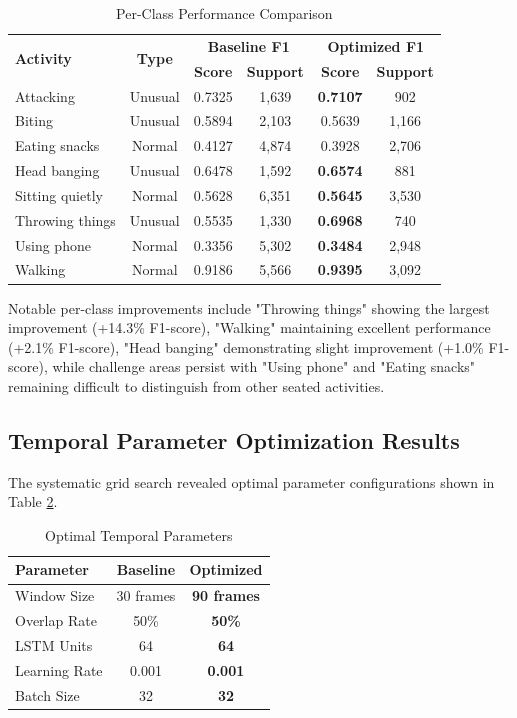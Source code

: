 \documentclass{iopconfser}
\begin{document}
\begin{table}[H]
\centering
\caption{Per-Class Performance Comparison}
\label{tab:class_performance}
\small
\begin{tabular}{lccccc}
\toprule
\multirow{2}{*}{\textbf{Activity}} & \multirow{2}{*}{\textbf{Type}} & \multicolumn{2}{c}{\textbf{Baseline F1}} & \multicolumn{2}{c}{\textbf{Optimized F1}} \\
\cmidrule(lr){3-4} \cmidrule(lr){5-6}
& & \textbf{Score} & \textbf{Support} & \textbf{Score} & \textbf{Support} \\
\midrule
Attacking & Unusual & 0.7325 & 1,639 & \textbf{0.7107} & 902 \\
Biting & Unusual & 0.5894 & 2,103 & 0.5639 & 1,166 \\
Eating snacks & Normal & 0.4127 & 4,874 & 0.3928 & 2,706 \\
Head banging & Unusual & 0.6478 & 1,592 & \textbf{0.6574} & 881 \\
Sitting quietly & Normal & 0.5628 & 6,351 & \textbf{0.5645} & 3,530 \\
Throwing things & Unusual & 0.5535 & 1,330 & \textbf{0.6968} & 740 \\
Using phone & Normal & 0.3356 & 5,302 & \textbf{0.3484} & 2,948 \\
Walking & Normal & 0.9186 & 5,566 & \textbf{0.9395} & 3,092 \\
\bottomrule
\end{tabular}
\end{table}

Notable per-class improvements include "Throwing things" showing the largest improvement (+14.3\% F1-score), "Walking" maintaining excellent performance (+2.1\% F1-score), "Head banging" demonstrating slight improvement (+1.0\% F1-score), while challenge areas persist with "Using phone" and "Eating snacks" remaining difficult to distinguish from other seated activities.

\subsection{Temporal Parameter Optimization Results}

The systematic grid search revealed optimal parameter configurations shown in Table \ref{tab:optimal_params}.

\begin{table}[H]
\centering
\caption{Optimal Temporal Parameters}
\label{tab:optimal_params}
\begin{tabular}{lcc}
\toprule
\textbf{Parameter} & \textbf{Baseline} & \textbf{Optimized} \\
\midrule
Window Size & 30 frames & \textbf{90 frames} \\
Overlap Rate & 50\% & \textbf{50\%} \\
LSTM Units & 64 & \textbf{64} \\
Learning Rate & 0.001 & \textbf{0.001} \\
Batch Size & 32 & \textbf{32} \\
\bottomrule
\end{tabular}
\end{table}
\end{document}
